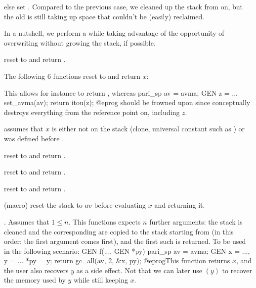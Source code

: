 \item else set . Compared to the previous case,
we cleaned up the stack from  on, but the old  is still
taking up space that couldn't be (easily) reclaimed.

In a nutshell, we perform a  while taking advantage of the
opportunity of overwriting  without growing the stack, if possible.

 reset  to  and return
.

The following 6 functions reset  to  and return $x$:





 This allows for instance
to return , whereas
\bprog
  pari_sp av = avma;
  GEN z = ...
  set_avma(av);
  return itou(z);
@eprog should be frowned upon since  conceptually
destroys everything from the reference point on, including $z$.

 assumes that $x$ is either not on the
stack (clone, universal constant such as ) or was defined
before .

 reset  to  and return
.

 reset  to  and return
.

 reset  to  and return
.

 (macro) reset the stack to $av$
before evaluating $x$ and returning it.

. Assumes that $1 \leq n$. This
functions expects $n$ further 
arguments: the stack is cleaned and the corresponding  are
copied to the stack starting from  (in this order: the first argument
comes first), and the first such  is returned. To be used in the
following scenario:
\bprog
  GEN f(..., GEN *py)
  {
    pari_sp av = avma;
    GEN x = ..., y = ...
    *py = y; return gc_all(av, 2, &x, py);
  }
@eprog\noindent This function returns $x$, and the user also recovers $y$
as a side effect. Not that we can later use $(y)$ to recover the
memory used by $y$ while still keeping $x$.

